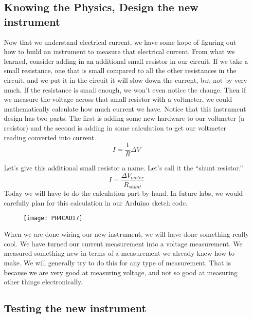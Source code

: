 \subsection{Knowing the Physics, Design the new instrument}

Now that we understand electrical current, we have some hope of figuring out
how to build an instrument to measure that electrical current. From what we
learned, consider adding in an additional small resistor in our circuit. If
we take a small resistance, one that is small compared to all the other
resistances in the circuit, and we put it in the circuit it will slow down
the current, but not by very much. If the resistance is small enough, we
won't even notice the change. Then if we measure the voltage across that
small resistor with a voltmeter, we could mathematically calculate how much
current we have. Notice that this instrument design has two parts. The first
is adding some new hardware to our voltmeter (a resistor) and the second is
adding in some calculation to get our voltmeter reading converted into
current. 
\begin{equation*}
I=\frac{1}{R}\Delta V
\end{equation*}

Let's give this additional small resistor a name. Let's call it the
\textquotedblleft shunt resistor.\textquotedblright\ 
\begin{equation*}
I=\frac{\Delta V_{meter}}{R_{shunt}}
\end{equation*}%
Today we will have to do the calculation part by hand. In future labs, we
would carefully plan for this calculation in our Arduino sketch code.

\begin{figure}[h!]
\texttt{[image: PH4CAU17]}
\end{figure}

When we are done wiring our new instrument, we will have done something
really cool. We have turned our current measurement into a voltage
measurement. We measured something new in terms of a measurement we already
knew how to make. We will generally try to do this for any type of
measurement. That is because we are very good at measuring voltage, and not
so good at measuring other things electronically.

\subsection{Testing the new instrument}

